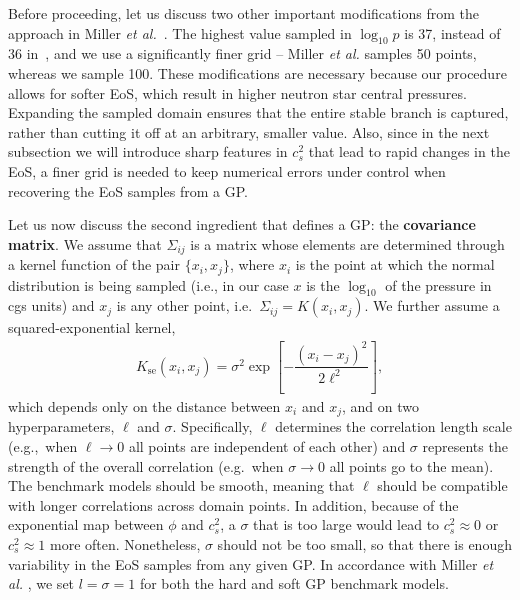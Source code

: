 \documentclass[aps,prd,nofootinbib,tightenlines,notitlepage,floatfix,superscriptaddress,showkeys,twocolumn]{revtex4-1}
\begin{document}
Before proceeding, let us discuss two other important modifications from the approach in Miller \textit{et al.}~\cite{Miller:2021qha}. The highest value sampled in $\log_{10} p$ is 37, instead of 36 in~\cite{Miller:2021qha}, and we use a significantly finer grid -- Miller \textit{et al.} samples 50 points, whereas we sample 100. These modifications are necessary because our procedure allows for softer EoS, which result in higher neutron star central pressures. Expanding the sampled domain ensures that the entire stable branch is captured, rather than cutting it off at an arbitrary, smaller value. Also, since in the next subsection we will introduce sharp features in $c_s^2$ that lead to rapid changes in the EoS, a finer grid is needed to keep numerical errors under control when recovering the EoS samples from a GP. 

Let us now discuss the second ingredient that defines a GP: the {\bf covariance matrix}. We assume that $\Sigma_{ij}$ is a matrix whose elements are determined through a kernel function of the pair $\{x_i,x_j\}$, where $x_i$ is the point at which the normal distribution is being sampled (i.e., in our case $x$ is the $\log_{10}$ of the pressure in cgs units) and $x_j$ is any other point, i.e.~$\Sigma_{ij} = K(x_i,x_j)$. We further assume a squared-exponential kernel,
\begin{align}\label{eq:kernel}
    K_{\textrm{se}}(x_i,x_j) = \sigma^2\exp{\left[-\dfrac{(x_i - x_j)^2}{2 \ell^2}\right]},
\end{align}
which depends only on the distance between $x_i$ and $x_j$, and on two hyperparameters, $\ell$ and $\sigma$. Specifically, $\ell$ determines the correlation length scale (e.g.,~when $\ell \rightarrow 0$ all points are independent of each other) and $\sigma$ represents the strength of the overall correlation (e.g.~when $\sigma \rightarrow 0$ all points go to the mean). The benchmark models should be smooth, meaning that $\ell$ should be compatible with longer correlations across domain points. In addition, because of the exponential map between $\phi$ and $c_s^2$, a $\sigma$ that is too large would lead to $c_s^2 \approx 0$ or $c_s^2 \approx 1$ more often. Nonetheless, $\sigma$ should not be too small, so that there is enough variability in the EoS samples from any given GP. In accordance with Miller \textit{et al.} \cite{Miller:2021qha}, we set $l=\sigma=1$ for both the hard and soft GP benchmark models. 
\end{document}
